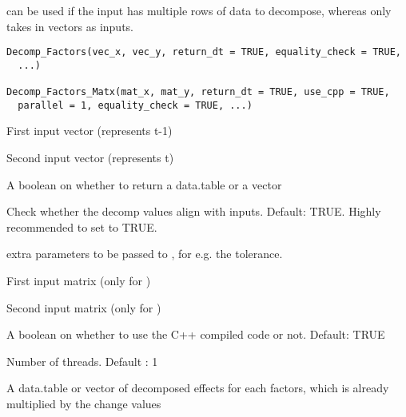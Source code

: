 \documentclass[a4paper]{book}
\begin{document}
%
\begin{Description}\relax
{} can be used if the input has
multiple rows of data to decompose, whereas  only
takes in vectors as inputs.
\end{Description}
%
\begin{Usage}
\begin{verbatim}
Decomp_Factors(vec_x, vec_y, return_dt = TRUE, equality_check = TRUE,
  ...)

Decomp_Factors_Matx(mat_x, mat_y, return_dt = TRUE, use_cpp = TRUE,
  parallel = 1, equality_check = TRUE, ...)
\end{verbatim}
\end{Usage}
%
\begin{Arguments}
\begin{ldescription}
\item[\code{vec\_x}] First input vector (represents t-1)

\item[\code{vec\_y}] Second input vector (represents t)

\item[\code{return\_dt}] A boolean on whether to return a data.table or a vector

\item[\code{equality\_check}] Check whether the decomp values align with inputs.
Default: TRUE. Highly recommended to set to TRUE.

\item[\code{...}] extra parameters to be passed to , for e.g.
the tolerance.

\item[\code{mat\_x}] First input matrix (only for )

\item[\code{mat\_y}] Second input matrix (only for )

\item[\code{use\_cpp}] A boolean on whether to use the C++ compiled code or not.
Default: TRUE

\item[\code{parallel}] Number of threads. Default : 1
\end{ldescription}
\end{Arguments}
%
\begin{Value}
A data.table or vector of decomposed effects for each factors,
which is already multiplied by the change values
\end{Value}
\end{document}
